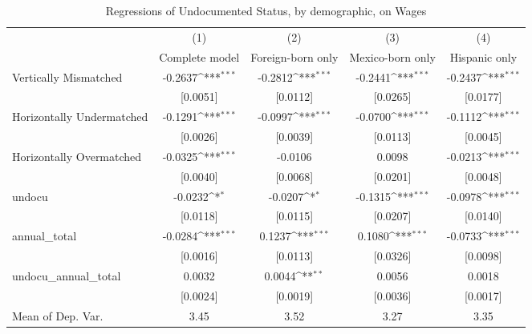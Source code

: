 \begin{table}[htbp]\centering
\def\sym#1{\ifmmode^{#1}\else\(^{#1}\)\fi}
\caption{Regressions of Undocumented Status, by demographic, on Wages}
\begin{tabular}{l*{4}{c}}
\toprule
                    &\multicolumn{1}{c}{(1)}         &\multicolumn{1}{c}{(2)}         &\multicolumn{1}{c}{(3)}         &\multicolumn{1}{c}{(4)}         \\
                    &Complete model         &Foreign-born only         &Mexico-born only         &Hispanic only         \\
\midrule
Vertically Mismatched&     -0.2637\sym{***}&     -0.2812\sym{***}&     -0.2441\sym{***}&     -0.2437\sym{***}\\
                    &    [0.0051]         &    [0.0112]         &    [0.0265]         &    [0.0177]         \\
\addlinespace
Horizontally Undermatched&     -0.1291\sym{***}&     -0.0997\sym{***}&     -0.0700\sym{***}&     -0.1112\sym{***}\\
                    &    [0.0026]         &    [0.0039]         &    [0.0113]         &    [0.0045]         \\
\addlinespace
Horizontally Overmatched&     -0.0325\sym{***}&     -0.0106         &      0.0098         &     -0.0213\sym{***}\\
                    &    [0.0040]         &    [0.0068]         &    [0.0201]         &    [0.0048]         \\
\addlinespace
undocu              &     -0.0232\sym{*}  &     -0.0207\sym{*}  &     -0.1315\sym{***}&     -0.0978\sym{***}\\
                    &    [0.0118]         &    [0.0115]         &    [0.0207]         &    [0.0140]         \\
\addlinespace
annual\_total        &     -0.0284\sym{***}&      0.1237\sym{***}&      0.1080\sym{***}&     -0.0733\sym{***}\\
                    &    [0.0016]         &    [0.0113]         &    [0.0326]         &    [0.0098]         \\
\addlinespace
undocu\_annual\_total &      0.0032         &      0.0044\sym{**} &      0.0056         &      0.0018         \\
                    &    [0.0024]         &    [0.0019]         &    [0.0036]         &    [0.0017]         \\
\midrule
Mean of Dep. Var.   &        3.45         &        3.52         &        3.27         &        3.35         \\

\end{tabular}
\end{table}
